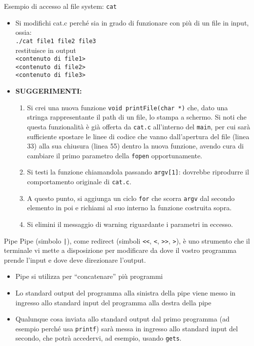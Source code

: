 \documentclass{beamer}
\begin{document}
\begin{frame}[fragile]{Esempio di accesso al file system: \texttt{cat}}
\begin{itemize}
 \item Si modifichi cat.c perché sia in grado di funzionare con più di un file in input, ossia: \\ \texttt{./cat file1 file2 file3} \\ restituisce in output \\ \texttt{<contenuto di file1> \\ <contenuto di file2> \\ <contenuto di file3>}
 \item \textbf{SUGGERIMENTI:}
 \begin{enumerate}
 \scriptsize
  \item Si crei una nuova funzione \texttt{void printFile(char *)} che, dato una stringa rappresentante il path di un file, lo stampa a schermo. Si noti che questa funzionalità è già offerta da \texttt{cat.c} all'interno del \texttt{main}, per cui sarà sufficiente spostare le linee di codice che vanno dall'apertura del file (linea 33) alla sua chiusura (linea 55) dentro la nuova funzione, avendo cura di cambiare il primo parametro della \texttt{fopen} opportunamente.
 \scriptsize
  \item Si testi la funzione chiamandola passando \texttt{argv[1]}: dovrebbe riprodurre il comportamento originale di \texttt{cat.c}.
 \scriptsize
  \item A questo punto, si aggiunga un ciclo \texttt{for} che scorra \texttt{argv} dal secondo elemento in poi e richiami al suo interno la funzione costruita sopra.
 \scriptsize
  \item Si elimini il messaggio di warning riguardante i parametri in eccesso.
 \end{enumerate}
\end{itemize}
\end{frame}

\begin{frame}[fragile]{Pipe}
Pipe (simbolo \texttt{|}), come redirect (simboli \texttt{<}\texttt{<}, \texttt{<}, \texttt{>}\texttt{>}, \texttt{>}), è uno strumento che il terminale vi mette a disposizione per modificare da dove il vostro programma prende l'input e dove deve direzionare l'output.
\begin{itemize}
 \item Pipe si utilizza per ``concatenare'' più programmi
 \item Lo standard output del programma alla sinistra della pipe viene messo in ingresso allo standard input del programma alla destra della pipe
 \item Qualunque cosa inviata allo standard output dal primo programma (ad esempio perché usa \texttt{printf}) sarà messa in ingresso allo standard input del secondo, che potrà accedervi, ad esempio, usando \texttt{gets}.
\end{itemize}

\end{frame}
\end{document}
